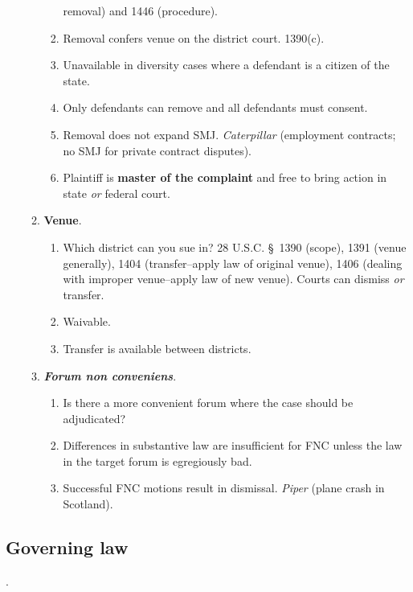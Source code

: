 \begin{enumerate}
\begin{enumerate}
\begin{enumerate}
            removal) and 1446 (procedure).
            \item Removal confers venue on the district court. 1390(c).
            \item Unavailable in diversity cases where a defendant is a 
            citizen of the state.
            \item Only defendants can remove and all defendants must consent.
            \item Removal does not expand SMJ. \emph{Caterpillar} (employment 
            contracts; no SMJ for private contract disputes).
            \item Plaintiff is \textbf{master of the complaint} and free to 
            bring action in state \emph{or} federal court.
        \end{enumerate}
        \item \textbf{Venue}.
        \begin{enumerate}
            \item Which district can you sue in? 28 U.S.C. \S\ 1390 (scope), 
            1391 (venue generally), 1404 (transfer--apply law of original 
            venue), 1406 (dealing with improper venue--apply law of new 
            venue). Courts can dismiss \emph{or} transfer.
            \item Waivable.
            \item Transfer is available between districts.
        \end{enumerate}
        \item \textbf{\emph{Forum non conveniens}}.
        \begin{enumerate}
            \item Is there a more convenient forum where the case should be 
            adjudicated?
            \item Differences in substantive law are insufficient for FNC 
            unless the law in the target forum is egregiously bad.
            \item Successful FNC motions result in dismissal. \emph{Piper} 
            (plane crash in Scotland).
        \end{enumerate}
    \end{enumerate}
\end{enumerate}

\subsection{Governing law}.

